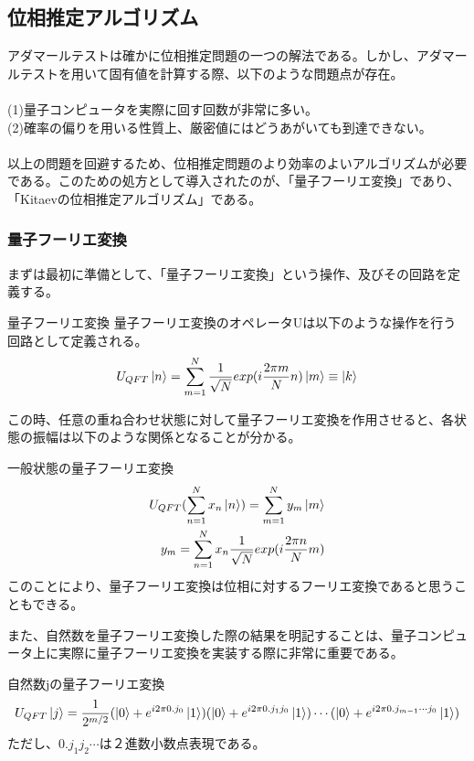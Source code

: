 \documentclass[a4paper,10.5pt]{article}
\numberwithin{equation}{section}
\begin{document}
\subsection{位相推定アルゴリズム}
アダマールテストは確かに位相推定問題の一つの解法である。しかし、アダマールテストを用いて固有値を計算する際、以下のような問題点が存在。\\
\\
(1)量子コンピュータを実際に回す回数が非常に多い。\\
(2)確率の偏りを用いる性質上、厳密値にはどうあがいても到達できない。\\
\\
以上の問題を回避するため、位相推定問題のより効率のよいアルゴリズムが必要である。このための処方として導入されたのが、「量子フーリエ変換」であり、「Kitaevの位相推定アルゴリズム」である。
\subsubsection{量子フーリエ変換}
まずは最初に準備として、「量子フーリエ変換」という操作、及びその回路を定義する。
\begin{defbox}{量子フーリエ変換}
量子フーリエ変換のオペレータUは以下のような操作を行う回路として定義される。
\begin{equation}\begin{split}
    U_{QFT}\ket{n}=\sum_{m=1}^{N}\frac{1}{\sqrt{N}}exp(i\frac{2\pi m}{N}n) \ket{m}\equiv \ket{k} \label{furie}
\end{split} \end{equation}
\end{defbox}
この時、任意の重ね合わせ状態に対して量子フーリエ変換を作用させると、各状態の振幅は以下のような関係となることが分かる。
\begin{resultbox}{一般状態の量子フーリエ変換}
\begin{equation}\begin{split}
    U_{QFT}(\sum_{n=1}^{N} x_{n}\ket{n} )= \sum_{m=1}^{N} y_{m}\ket{m}\\
    y_{m} = \sum_{n=1}^{N} x_{n} \frac{1}{\sqrt{N}}exp(i\frac{2\pi n}{N}m)
\end{split} \end{equation}
このことにより、量子フーリエ変換は位相に対するフーリエ変換であると思うこともできる。
\end{resultbox}
また、自然数を量子フーリエ変換した際の結果を明記することは、量子コンピュータ上に実際に量子フーリエ変換を実装する際に非常に重要である。
\begin{resultbox}{自然数jの量子フーリエ変換}
\begin{equation}\begin{split}
   U_{QFT}\ket{j} 
	= \frac{1}{2^{m/2}} (\ket{0}+e^{i2\pi 0.j_{0}} \ket{1})
                                  (\ket{0}+e^{i2\pi 0.j_{1}j_{0}} \ket{1})
                                \cdots(\ket{0}+e^{i2\pi 0.j_{m-1}\cdots j_{0}} \ket{1})
\end{split} \end{equation}
ただし、$0.j_{1}j_{2}\cdots$は２進数小数点表現である。
\end{resultbox}
\end{document}
